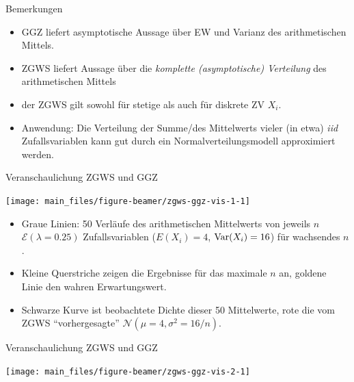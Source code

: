 \documentclass[
  10pt,
  ignorenonframetext,
]{beamer}
\providecommand{\tightlist}{%
  \setlength{\itemsep}{0pt}\setlength{\parskip}{0pt}}
\begin{document}
\begin{frame}{Bemerkungen}
\label{bemerkungen-2}
\begin{itemize}
\item
  GGZ liefert asymptotische Aussage über EW und Varianz des
  arithmetischen Mittels.
\item
  ZGWS liefert Aussage über die \emph{komplette (asymptotische)
  Verteilung} des arithmetischen Mittels
\item
  der ZGWS gilt sowohl für stetige als auch für diskrete ZV \(X_i\).
\item
  Anwendung: Die Verteilung der Summe/des Mittelwerts vieler (in etwa)
  \emph{iid} Zufallsvariablen kann gut durch ein Normalverteilungsmodell
  approximiert werden.
\end{itemize}
\end{frame}

\begin{frame}{Veranschaulichung ZGWS und GGZ}
\label{veranschaulichung-zgws-und-ggz}
\scriptsize

\begin{center}\texttt{[image: main\_files/figure-beamer/zgws-ggz-vis-1-1]} \end{center}

\normalsize

\small

\begin{itemize}
\tightlist
\item
  Graue Linien: 50 Verläufe des arithmetischen Mittelwerts von jeweils
  \(n\) \(\mathcal{E}(\lambda= 0.25)\) Zufallsvariablen (\(E(X_i) = 4\),
  \(\operatorname{Var}(X_i) = 16\)) für wachsendes \(n\).
\item
  Kleine Querstriche zeigen die Ergebnisse für das maximale \(n\) an,
  goldene Linie den wahren Erwartungswert.
\item
  Schwarze Kurve ist beobachtete Dichte dieser 50 Mittelwerte, rote die
  vom ZGWS ``vorhergesagte'' \(\mathcal{N}(\mu = 4, \sigma^2 = 16/n)\).
\end{itemize}
\end{frame}

\begin{frame}{Veranschaulichung ZGWS und GGZ}
\label{veranschaulichung-zgws-und-ggz-1}
\scriptsize

\begin{center}\texttt{[image: main\_files/figure-beamer/zgws-ggz-vis-2-1]} \end{center}

\normalsize
\end{frame}
\end{document}
